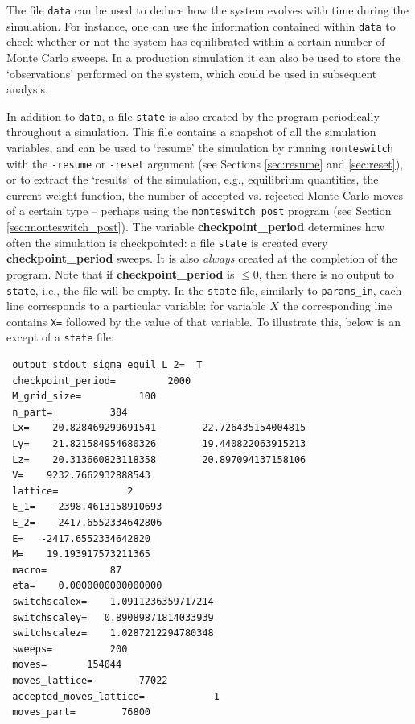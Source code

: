 \documentclass{report}
\begin{document}
The file \texttt{data} can be used to deduce how the system evolves with time during the simulation. For instance, one can use the information contained 
within \texttt{data} to check whether or not the system has equilibrated within a certain number of Monte Carlo sweeps. In a production simulation it
can also be used to store the `observations' performed on the system, which could be used in subsequent analysis.

In addition to \texttt{data}, a file \texttt{state} is also created by the program periodically throughout a simulation. This file contains a
snapshot of all the 
simulation variables, and can be used to `resume' the simulation by running \texttt{monteswitch} with the \texttt{-resume} or \texttt{-reset} argument
(see Sections \ref{sec:resume} and \ref{sec:reset}), or to extract the `results' of the simulation, e.g., equilibrium quantities, the current weight 
function, the number of accepted vs. rejected Monte Carlo moves of a certain type -- perhaps using the \texttt{monteswitch\_post} program 
(see Section \ref{sec:monteswitch_post}).
The variable \textbf{checkpoint\_period} determines how often the simulation is checkpointed: a file \texttt{state} is created every 
\textbf{checkpoint\_period} sweeps. It is also \emph{always} created at the completion of the program. Note that if \textbf{checkpoint\_period} is $\leq 0$, 
then there is no output to \texttt{state}, i.e., the file will be empty.
In the \texttt{state} file, similarly to \texttt{params\_in}, each line corresponds to a particular variable: for variable $X$ the corresponding line contains
\texttt{X=} followed by the value of that variable. To illustrate this, below is an except of a \texttt{state} file:
\begin{verbatim}
 output_stdout_sigma_equil_L_2=  T
 checkpoint_period=         2000
 M_grid_size=          100
 n_part=          384
 Lx=    20.828469299691541        22.726435154004815     
 Ly=    21.821584954680326        19.440822063915213     
 Lz=    20.313660823118358        20.897094137158106     
 V=    9232.7662932888543     
 lattice=            2
 E_1=   -2398.4613158910693     
 E_2=   -2417.6552334642806     
 E=   -2417.6552334642820     
 M=    19.193917573211365     
 macro=           87
 eta=    0.0000000000000000     
 switchscalex=    1.0911236359717214     
 switchscaley=   0.89089871814033939     
 switchscalez=    1.0287212294780348     
 sweeps=          200
 moves=       154044
 moves_lattice=        77022
 accepted_moves_lattice=            1
 moves_part=        76800
\end{verbatim}
\end{document}
